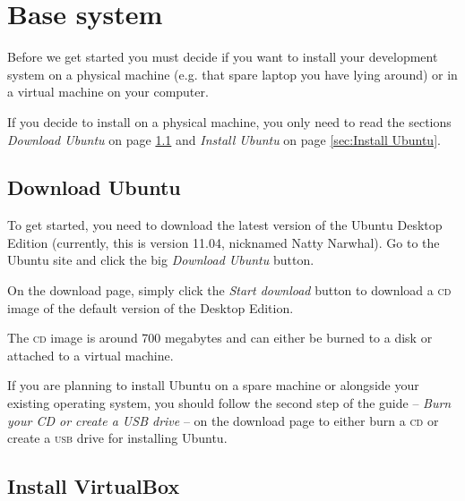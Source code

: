 \documentclass[final,ebook,10pt,twoside,openright]{memoir}
\begin{document}
\chapter{Base system} %
\label{cha:Base system}

\noindent
Before we get started you must decide if you want to install your development system on a physical machine (e.g. that spare laptop you have lying around) or in a virtual machine on your computer.

If you decide to install on a physical machine, you only need to read the sections \emph{Download Ubuntu} on page \ref{sec:Download Ubuntu} and \emph{Install Ubuntu} on page \ref{sec:Install Ubuntu}.

\section{Download Ubuntu}
\label{sec:Download Ubuntu}

To get started, you need to download the latest version of the Ubuntu Desktop Edition (currently, this is version 11.04, nicknamed Natty Narwhal). Go to the Ubuntu site and click the big \emph{Download Ubuntu} button.


On the download page, simply click the \emph{Start download} button to download a \textsc{cd} image of the default version of the Desktop Edition.


The \textsc{cd} image is around 700 megabytes and can either be burned to a disk or attached to a virtual machine.

If you are planning to install Ubuntu on a spare machine or alongside your existing operating system, you should follow the second step of the guide -- \emph{Burn your CD or create a USB drive} -- on the download page to either burn a \textsc{cd} or create a \textsc{usb} drive for installing Ubuntu.

\section{Install VirtualBox}
\label{sec:Install VirtualBox}
\end{document}
